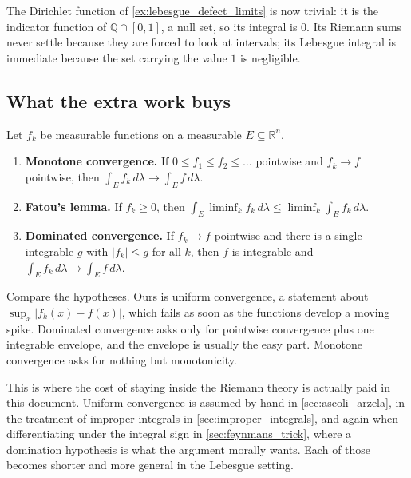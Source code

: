 The Dirichlet function of \cref{ex:lebesgue_defect_limits} is now trivial: it is the indicator
function of $\mathbb{Q}\cap[0,1]$, a null set, so its integral is $0$. Its Riemann sums never
settle because they are forced to look at intervals; its Lebesgue integral is immediate because the
set carrying the value $1$ is negligible.

\subsection{What the extra work buys}

\begin{theorem}
\label{thm:lebesgue_convergence_theorems}
Let $f_k$ be measurable functions on a measurable $E \subseteq \mathbb{R}^n$.
\begin{enumerate}[label=\textbf{(\alph*)}]
  \item \textbf{Monotone convergence.} If $0 \le f_1 \le f_2 \le \dots$ pointwise and
    $f_k \to f$ pointwise, then $\int_E f_k\,d\lambda \to \int_E f\,d\lambda$.
  \item \textbf{Fatou's lemma.} If $f_k \ge 0$, then
    $\int_E \liminf_k f_k \,d\lambda \le \liminf_k \int_E f_k\,d\lambda$.
  \item \textbf{Dominated convergence.} If $f_k \to f$ pointwise and there is a single integrable
    $g$ with $\lvert f_k\rvert \le g$ for all $k$, then $f$ is integrable and
    $\int_E f_k\,d\lambda \to \int_E f\,d\lambda$.
\end{enumerate}
\end{theorem}

\begin{remark}
\label{rem:why_dominated_convergence_matters}
Compare the hypotheses. Ours is uniform convergence, a statement about $\sup_x\lvert f_k(x)-f(x)
\rvert$, which fails as soon as the functions develop a moving spike. Dominated convergence asks
only for pointwise convergence plus one integrable envelope, and the envelope is usually the easy
part. Monotone convergence asks for nothing but monotonicity.

This is where the cost of staying inside the Riemann theory is actually paid in this document.
Uniform convergence is assumed by hand in \cref{sec:ascoli_arzela}, in the treatment of improper
integrals in \cref{sec:improper_integrals}, and again when differentiating under the integral sign
in \cref{sec:feynmans_trick}, where a domination hypothesis is what the argument morally wants.
Each of those becomes shorter and more general in the Lebesgue setting.
\end{remark}

